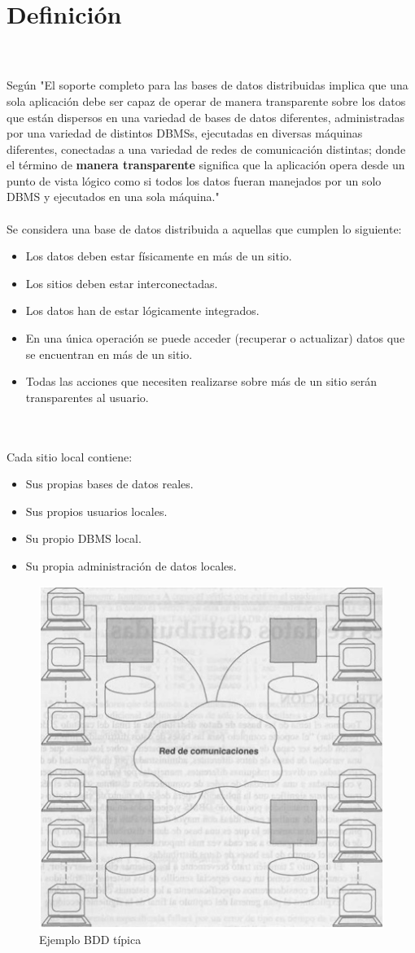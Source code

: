 \documentclass[10pt,a4paper,oneside]{article}
\begin{document}
\section{Definici\'on}
\\\\Seg\'un \cite{Date} "El soporte completo para las bases de datos distribuidas implica que una sola aplicaci\'on debe ser capaz de operar de manera transparente sobre los datos que est\'an dispersos en una variedad de bases de datos diferentes, administradas por una variedad de distintos DBMSs, ejecutadas en diversas m\'aquinas diferentes, conectadas a una variedad de redes de comunicaci\'on distintas; donde el t\'ermino de {\bf manera transparente} significa que la aplicaci\'on opera desde un punto de vista l\'ogico como si todos los datos fueran manejados por un solo DBMS y ejecutados en una sola m\'aquina."
\\\\Se considera una base de datos distribuida a aquellas que cumplen lo siguiente:
\begin {itemize}
\item Los datos deben estar f\'isicamente en m\'as de un sitio.
\item Los sitios deben estar interconectadas.
\item Los datos han de estar l\'ogicamente integrados. 
\item En una \'unica operaci\'on se puede acceder (recuperar o actualizar) datos que se encuentran en m\'as de un sitio.
\item Todas las acciones que necesiten realizarse sobre m\'as de un sitio ser\'an transparentes al usuario.
\end {itemize}
\\\\Cada sitio local contiene:
\begin {itemize}

\item Sus propias bases de datos reales.
\item Sus propios usuarios locales.
\item Su propio DBMS local.
\item Su propia administraci\'on de datos locales.
\end {itemize}
\begin {figure} [¡h]
\centering
\includegraphics [width=0.4 \textwidth] {fig1}
\caption {Ejemplo BDD t\'ipica}
\label {fig:fig1}
\end {figure}
\end{document}
